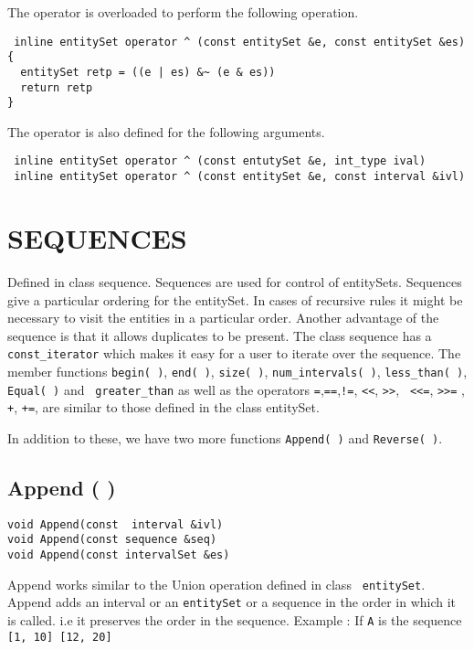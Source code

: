 \documentclass[letterpaper,12pt]{article}
\begin{document}
The operator {\tt {}} is overloaded to perform  the following operation.
\begin{verbatim}
 inline entitySet operator ^ (const entitySet &e, const entitySet &es)
{
  entitySet retp = ((e | es) &~ (e & es)) 
  return retp
}
\end{verbatim}
The {\tt {}} operator is also defined for the following arguments.

\begin{verbatim}
 inline entitySet operator ^ (const entutySet &e, int_type ival)
 inline entitySet operator ^ (const entitySet &e, const interval &ivl)
\end{verbatim}


\newpage
\section{SEQUENCES}

Defined in class sequence. Sequences are used for control of
entitySets.  Sequences give a particular ordering for the
entitySet. In cases of recursive rules it might be necessary to visit
the entities in a particular order. Another advantage of the sequence
is that it allows duplicates to be present.  The class sequence has a
{\tt const\_iterator} which makes it easy for a user to iterate over
the sequence. The member functions {\tt begin( )}, {\tt end( )}, {\tt size( )},
{\tt num\_intervals( )}, {\tt less\_than( )}, {\tt Equal( )} and {\tt
greater\_than} as well
as the operators {\tt =},{\tt ==},{\tt !=}, {\tt <<}, {\tt >>}, {\tt
<<=}, {\tt >>=} , {\tt +}, {\tt +=}, are similar to
those defined in the class entitySet.

In addition to these, we have two more functions {\tt Append( )} and
{\tt Reverse( )}.

\subsection{Append ( )}
\begin{verbatim}
void Append(const  interval &ivl)
void Append(const sequence &seq)
void Append(const intervalSet &es)
\end{verbatim}

Append works similar to the Union operation defined in class {\tt
entitySet}. Append adds an interval or an {\tt entitySet} or a sequence in
the order in which it is called. i.e it preserves the order in the
sequence.  Example : If {\tt A} is the sequence {\tt [1, 10] [12, 20]} \\
\end{document}
